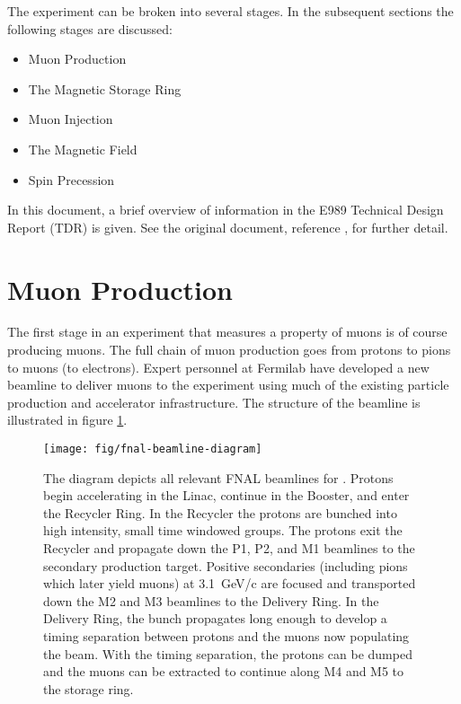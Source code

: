 The \mugmtwo experiment can be broken into several stages.  In the subsequent sections the following stages are discussed:

\begin{itemize}[noitemsep]
\item{Muon Production}
\item{The Magnetic Storage Ring}
\item{Muon Injection}
\item{The Magnetic Field}
\item{Spin Precession}
\end{itemize}

\noindent
In this document, a brief overview of information in the E989 Technical Design Report (TDR) is given. See the original document, reference \cite{e989-tdr}, for further detail. 

\section{Muon Production} \label{sec:muon-production}

The first stage in an experiment that measures a property of muons is of course producing muons. The full chain of muon production goes from protons to pions to muons (to electrons).  Expert personnel at Fermilab have developed a new beamline to deliver muons to the \gmtwo experiment using much of the existing particle production and accelerator infrastructure.  The structure of the beamline is illustrated in figure \ref{fig:fnal-beamline-diagram}.


\begin{figure}
\texttt{[image: fig/fnal-beamline-diagram]}
\caption{
    The diagram depicts all relevant FNAL beamlines for \gmtwo.  Protons begin accelerating in the Linac, continue in the Booster, and enter the Recycler Ring. In the Recycler the protons are bunched into high intensity, small time windowed groups.  The protons exit the Recycler and propagate down the P1, P2, and M1 beamlines to the secondary production target.  Positive secondaries (including pions which later yield muons) at \SI{3.1}{\GeV/c} are focused and transported down the M2 and M3 beamlines to the Delivery Ring.  In the Delivery Ring, the bunch propagates long enough to develop a timing separation between protons and the muons now populating the beam.  With the timing separation, the protons can be dumped and the muons can be extracted to continue along M4 and M5 to the \gmtwo storage ring. 
    \label{fig:fnal-beamline-diagram}
}
\end{figure}

